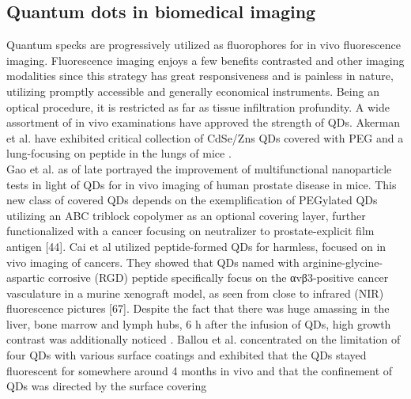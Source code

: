 \documentclass{article}
\begin{document}
\subsection*{ Quantum dots in biomedical imaging}
Quantum specks are progressively utilized as fluorophores for in vivo fluorescence imaging. Fluorescence imaging enjoys a few benefits contrasted and other imaging modalities since this strategy has great responsiveness and is painless in nature, utilizing promptly accessible and generally economical instruments. Being an optical procedure, it is restricted as far as tissue infiltration profundity. A wide assortment of in vivo examinations have approved the strength of QDs. Akerman et al. have exhibited critical collection of CdSe/Zns QDs covered with PEG and a lung-focusing on peptide in the lungs of mice .\\Gao et al. as of late portrayed the improvement of multifunctional nanoparticle tests in light of QDs for in vivo imaging of human prostate disease in mice. This new class of covered QDs depends on the exemplification of PEGylated QDs utilizing an ABC triblock copolymer as an optional covering layer, further functionalized with a cancer focusing on neutralizer to prostate-explicit film antigen [44]. Cai et al utilized peptide-formed QDs for harmless, focused on in vivo imaging of cancers. They showed that QDs named with arginine-glycine-aspartic corrosive (RGD) peptide specifically focus on the αvβ3-positive cancer vasculature in a murine xenograft model, as seen from close to infrared (NIR) fluorescence pictures [67]. Despite the fact that there was huge amassing in the liver, bone marrow and lymph hubs, 6 h after the infusion of QDs, high growth contrast was additionally noticed . Ballou et al. concentrated on the limitation of four QDs with various surface coatings and exhibited that the QDs stayed fluorescent for somewhere around 4 months in vivo and that the confinement of QDs was directed by the surface covering
\begin{itemize}
     
    
\end{itemize}





 
 
\end{document}
